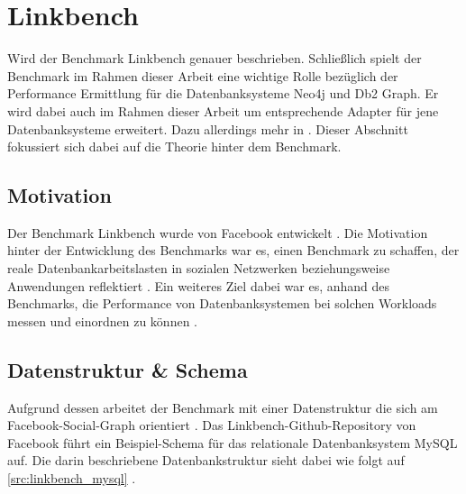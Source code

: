 \section{Linkbench}
\label{linkbench}

Wird der Benchmark Linkbench genauer beschrieben. Schließlich spielt der Benchmark im Rahmen dieser Arbeit eine wichtige Rolle bezüglich der Performance Ermittlung für die Datenbanksysteme Neo4j und Db2 Graph. Er wird dabei auch im Rahmen dieser Arbeit um entsprechende Adapter für jene Datenbanksysteme erweitert. Dazu allerdings mehr in . Dieser Abschnitt fokussiert sich dabei auf die Theorie hinter dem Benchmark. 

\subsection{Motivation}
Der Benchmark Linkbench wurde von Facebook entwickelt \cite{linkbench_paper}. Die Motivation hinter der Entwicklung des Benchmarks war es, einen Benchmark zu schaffen, der reale Datenbankarbeitslasten in sozialen Netzwerken beziehungsweise Anwendungen reflektiert \cite{linkbench_paper}. Ein weiteres Ziel dabei war es, anhand des Benchmarks, die Performance von Datenbanksystemen bei solchen Workloads messen und einordnen zu können \cite{linkbench_paper}.

\subsection{Datenstruktur \& Schema}
Aufgrund dessen arbeitet der Benchmark mit einer Datenstruktur die sich am Facebook-Social-Graph orientiert \cite{linkbench_paper}. Das Linkbench-Github-Repository \cite{fb_linkbench_github} von Facebook führt ein Beispiel-Schema für das relationale Datenbanksystem MySQL auf. Die darin beschriebene Datenbankstruktur sieht dabei wie folgt auf \autoref{src:linkbench_mysql} \cite{fb_linkbench_github}. 

